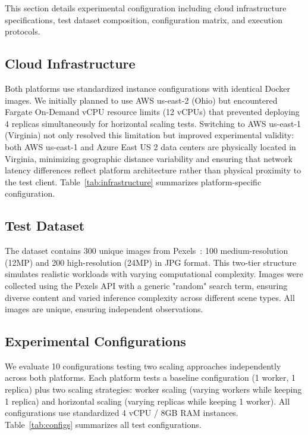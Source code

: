This section details experimental configuration including cloud infrastructure specifications, test dataset composition, configuration matrix, and execution protocols.

\subsection{Cloud Infrastructure}

Both platforms use standardized instance configurations with identical Docker~\cite{docker2024} images. We initially planned to use AWS us-east-2 (Ohio) but encountered Fargate On-Demand vCPU resource limits (12 vCPUs) that prevented deploying 4 replicas simultaneously for horizontal scaling tests. Switching to AWS us-east-1 (Virginia) not only resolved this limitation but improved experimental validity: both AWS us-east-1 and Azure East US 2 data centers are physically located in Virginia, minimizing geographic distance variability and ensuring that network latency differences reflect platform architecture rather than physical proximity to the test client. Table~\ref{tab:infrastructure} summarizes platform-specific configuration.

\subsection{Test Dataset}

The dataset contains 300 unique images from Pexels~\cite{pexels}: 100 medium-resolution (12MP) and 200 high-resolution (24MP) in JPG format. This two-tier structure simulates realistic workloads with varying computational complexity. Images were collected using the Pexels API with a generic "random" search term, ensuring diverse content and varied inference complexity across different scene types. All images are unique, ensuring independent observations.

\subsection{Experimental Configurations}

We evaluate 10 configurations testing two scaling approaches independently across both platforms. Each platform tests a baseline configuration (1 worker, 1 replica) plus two scaling strategies: worker scaling (varying workers while keeping 1 replica) and horizontal scaling (varying replicas while keeping 1 worker). All configurations use standardized 4 vCPU / 8GB RAM instances. Table~\ref{tab:configs} summarizes all test configurations.


